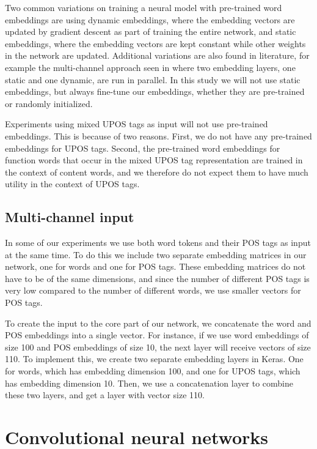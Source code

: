 Two common variations on training a neural model with pre-trained word
embeddings are using dynamic embeddings, where the embedding vectors are
updated by gradient descent as part of training the entire network, and
static embeddings, where the embedding vectors are kept constant while other
weights in the network are updated. Additional variations are also found in
literature, for example the multi-channel approach seen in
\textcite{kim2014convolutional} where two embedding layers, one static and
one dynamic, are run in parallel. In this study we will not use static
embeddings, but always fine-tune our embeddings, whether they are pre-trained
or randomly initialized.

Experiments using mixed UPOS tags as input will not use pre-trained
embeddings. This is because of two reasons. First, we do not have any
pre-trained embeddings for UPOS tags. Second, the pre-trained word embeddings
for function words that occur in the mixed UPOS tag representation are
trained in the context of content words, and we therefore do not expect them
to have much utility in the context of UPOS tags.


\subsection{Multi-channel input}

In some of our experiments we use both word tokens and their POS tags as
input at the same time. To do this we include two separate embedding matrices
in our network, one for words and one for POS tags. These embedding matrices
do not have to be of the same dimensions, and since the number of different
POS tags is very low compared to the number of different words, we use
smaller vectors for POS tags.

To create the input to the core part of our network, we concatenate the word
and POS embeddings into a single vector. For instance, if we use word
embeddings of size 100 and POS embeddings of size 10, the next layer will
receive vectors of size 110. To implement this, we create two separate
embedding layers in Keras. One for words, which has embedding dimension 100,
and one for UPOS tags, which has embedding dimension 10. Then, we use a
concatenation layer to combine these two layers, and get a layer with vector
size 110.


\section{Convolutional neural networks}

